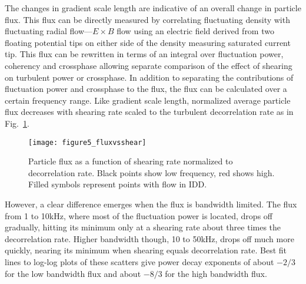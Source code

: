 \documentclass[%
 aip,
 amsmath,amssymb,
 preprint,%
]{revtex4-1}
\begin{document}
The changes in gradient scale length are indicative of an overall change in particle flux. This flux can be directly measured by correlating fluctuating density with fluctuating radial flow---$E \times B$ flow using an electric field derived from two floating potential tips on either side of the density measuring saturated current tip. This flux can be rewritten in terms of an integral over fluctuation power, coherency and crossphase allowing separate comparison of the effect of shearing on turbulent power or crossphase. In addition to separating the contributions of fluctuation power and crossphase to the flux, the flux can be calculated over a certain frequency range. Like gradient scale length, normalized average particle flux decreases with shearing rate scaled to the turbulent decorrelation rate as in 
Fig.~\ref{fig:fluxvsshear}. 
\begin{figure}
\texttt{[image: figure5\_fluxvsshear]}%
\caption{\label{fig:fluxvsshear} Particle flux as a function of shearing rate normalized to decorrelation rate. Black points show low frequency, red shows high. Filled symbols represent points with flow in IDD.}
\end{figure}
However, a clear difference emerges when the flux is bandwidth limited. The flux from 1 to 10kHz, where most of the fluctuation power is located, drops off gradually, hitting its minimum only at a shearing rate about three times the decorrelation rate. Higher bandwidth though, 10 to 50kHz, drops off much more quickly, nearing its minimum when shearing equals decorrelation rate. Best fit lines to log-log plots of these scatters give power decay exponents of about $-2/3$ for the low bandwidth flux and about $-8/3$ for the high bandwidth flux. 
\end{document}
